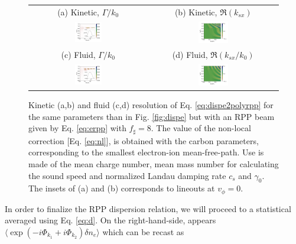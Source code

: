 \documentclass[
 reprint,
 amsmath,amssymb,
 aps,
]{revtex4-1}
\begin{document}
\begin{figure}
\begin{tabular}{cc}
(a) Kinetic, $\Gamma/k_0$ &
(b)  Kinetic, $\Re(k_{sx})$ \\
\includegraphics[width=0.24\textwidth]{Grpp_CH_new.png}&
\includegraphics[width=0.24\textwidth]{krpp_CH.png}\\
(c) Fluid, $\Gamma/k_0$  &
(d) Fluid, $\Re(k_{sx}/k_0)$  \\
\includegraphics[width=0.24\textwidth]{Gfrpp_CH_new.png}&
\includegraphics[width=0.24\textwidth]{kfrpp_CH.png}
\end{tabular}
\caption{ \label{fig:dispeCHrpp}  
Kinetic (a,b) and fluid (c,d) resolution of Eq. \eqref{eq:dispe2polyrpp} for  the same parameters than in Fig. \ref{fig:dispe} but with an RPP beam given by Eq. \eqref{eq:erpp} with $f_\sharp=8$.  The value of the non-local correction [Eq. \eqref{eq:nl}], is obtained with the carbon parameters, corresponding to the smallest electron-ion mean-free-path. Use is made of the mean charge number, mean mass number   for calculating the sound speed and normalized Landau damping rate $c_s$ and $\gamma_0$.
The insets  of (a) and (b) corresponds to lineouts at $v_\phi=0$. 
 }
\end{figure}
In order to finalize the RPP dispersion relation, we will proceed to a statistical averaged using Eq. \eqref{eq:d}. On the right-hand-side, appears $\langle\exp(-i\Phi_{k_1}+i\Phi_{k_2})\delta n_e \rangle$ which can be recast as
\end{document}
